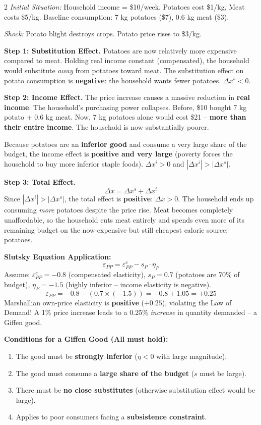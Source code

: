 \documentclass[10pt,a4paper]{article}
\begin{document}
\begin{multicols}{2}
\textit{Initial Situation:} Household income = \$10/week. Potatoes cost \$1/kg, Meat costs \$5/kg. Baseline consumption: 7 kg potatoes (\$7), 0.6 kg meat (\$3).

\textit{Shock:} Potato blight destroys crops. Potato price rises to \$3/kg.

\textbf{Step 1: Substitution Effect.}
Potatoes are now relatively more expensive compared to meat. Holding real income constant (compensated), the household would substitute \textit{away} from potatoes toward meat. The substitution effect on potato consumption is \textbf{negative}: the household wants fewer potatoes. $\Delta x^s < 0$.

\textbf{Step 2: Income Effect.}
The price increase causes a massive reduction in \textbf{real income}. The household's purchasing power collapses. Before, \$10 bought 7 kg potato + 0.6 kg meat. Now, 7 kg potatoes alone would cost \$21 -- \textbf{more than their entire income}. The household is now substantially poorer.

Because potatoes are an \textbf{inferior good} and consume a very large share of the budget, the income effect is \textbf{positive and very large} (poverty forces the household to buy more inferior staple foods). $\Delta x^i > 0$ and $|\Delta x^i| > |\Delta x^s|$.

\textbf{Step 3: Total Effect.}
\[
\Delta x = \Delta x^s + \Delta x^i
\]
Since $|\Delta x^i| > |\Delta x^s|$, the total effect is \textbf{positive}: $\Delta x > 0$. The household ends up consuming \textit{more} potatoes despite the price rise. Meat becomes completely unaffordable, so the household cuts meat entirely and spends even more of its remaining budget on the now-expensive but still cheapest calorie source: potatoes.

\textbf{Slutsky Equation Application:}
\[
\varepsilon_{PP} = \varepsilon_{PP}^c - s_P \cdot \eta_P
\]
Assume: $\varepsilon_{PP}^c = -0.8$ (compensated elasticity), $s_P = 0.7$ (potatoes are 70\% of budget), $\eta_P = -1.5$ (highly inferior -- income elasticity is negative).
\[
\varepsilon_{PP} = -0.8 - (0.7 \times (-1.5)) = -0.8 + 1.05 = +0.25
\]
Marshallian own-price elasticity is \textbf{positive} ($+0.25$), violating the Law of Demand! A 1\% price increase leads to a 0.25\% \textit{increase} in quantity demanded -- a Giffen good.

\textbf{Conditions for a Giffen Good (All must hold):}
\begin{enumerate}[leftmargin=*,nosep]
    \item The good must be \textbf{strongly inferior} ($\eta < 0$ with large magnitude).
    \item The good must consume a \textbf{large share of the budget} ($s$ must be large).
    \item There must be \textbf{no close substitutes} (otherwise substitution effect would be large).
    \item Applies to poor consumers facing a \textbf{subsistence constraint}.
\end{enumerate}


\end{multicols}
\end{document}
